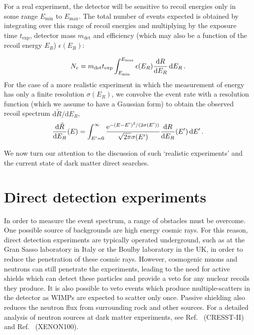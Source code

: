 For a real experiment, the detector will be sensitive to recoil energies only in some range $E_\textrm{min}$ to $E_\textrm{max}$. The total number of events expected is obtained by integrating over this range of recoil energies and multiplying by the exposure time $t_\textrm{exp}$, detector mass $m_\textrm{det}$ and efficiency (which may also be a function of the recoil energy $E_R$) $\epsilon(E_R)$:

\begin{equation}
\label{eq:DD:N_expected}
N_e = m_\textrm{det} t_\textrm{exp} \int_{E_\textrm{min}}^{E_\textrm{max}}\epsilon(E_R) \frac{\mathrm{d}R}{\mathrm{d}E_R} \, \mathrm{d}E_R\,.
\end{equation}
For the case of a more realistic experiment in which the measurement of energy has only a finite resolution $\sigma(E_R)$, we convolve the event rate with a resolution function (which we assume to have a Gaussian form) to obtain the observed recoil spectrum $\mathrm{d}\tilde{R}/\mathrm{d}E_R$,
\begin{equation}
\frac{\mathrm{d}\tilde{R}}{\mathrm{d}E_R}(E) = \int_{E' = 0}^{\infty} \frac{\mathrm{e}^{-(E - E')^2/(2\sigma(E'))}}{\sqrt{2\pi}\sigma(E')} \frac{\mathrm{d}R}{\mathrm{d}E_R}(E') \, \mathrm{d}E'\,.
\end{equation}

We now turn our attention to the discussion of such `realistic experiments' and the current state of dark matter direct searches.



\section{Direct detection experiments}




In order to measure the event spectrum, a range of obstacles must be overcome. One possible source of backgrounds are high energy cosmic rays. For this reason, direct detection experiments are typically operated underground, such as at the Gran Sasso laboratory in Italy or the Boulby laboratory in the UK, in order to reduce the penetration of these cosmic rays. However, cosmogenic muons and neutrons can still penetrate the experiments, leading to the need for active shields which can detect these particles and provide a veto for any nuclear recoils they produce. It is also possible to veto events which produce multiple-scatters in the detector as WIMPs are expected to scatter only once. Passive shielding also reduces the neutron flux from surrounding rock and other sources. For a detailed analysis of neutron sources at dark matter experiments, see Ref.~\cite{Scholl:2012} (CRESST-II) and Ref.~\cite{Aprile:2013b} (XENON100).

